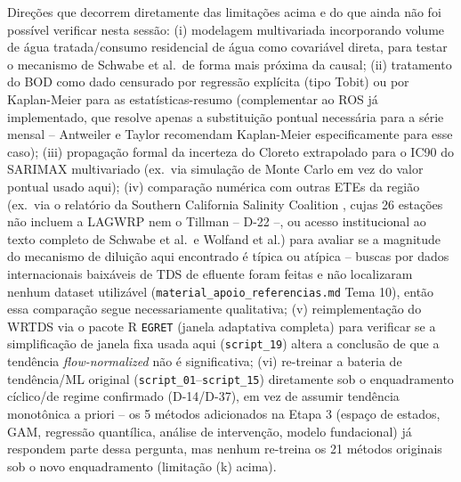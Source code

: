 Direções que decorrem diretamente das limitações acima e do que ainda não foi possível verificar nesta sessão: (i) modelagem multivariada incorporando volume de água tratada/consumo residencial de água como covariável direta, para testar o mecanismo de Schwabe et al.\ de forma mais próxima da causal; (ii) tratamento do BOD como dado censurado por regressão explícita (tipo Tobit) ou por Kaplan-Meier para as estatísticas-resumo (complementar ao ROS já implementado, que resolve apenas a substituição pontual necessária para a série mensal -- Antweiler e Taylor \cite{antweiler2008evaluation} recomendam Kaplan-Meier especificamente para esse caso); (iii) propagação formal da incerteza do Cloreto extrapolado para o IC90 do SARIMAX multivariado (ex.\ via simulação de Monte Carlo em vez do valor pontual usado aqui); (iv) comparação numérica com outras ETEs da região (ex.\ via o relatório da Southern California Salinity Coalition \cite{scsc2018tds}, cujas 26 estações não incluem a LAGWRP nem o Tillman -- D-22 --, ou acesso institucional ao texto completo de Schwabe et al.\ e Wolfand et al.) para avaliar se a magnitude do mecanismo de diluição aqui encontrado é típica ou atípica -- buscas por dados internacionais baixáveis de TDS de efluente foram feitas e não localizaram nenhum dataset utilizável (\texttt{material\_apoio\_referencias.md} Tema 10), então essa comparação segue necessariamente qualitativa; (v) reimplementação do WRTDS via o pacote R \texttt{EGRET} (janela adaptativa completa) para verificar se a simplificação de janela fixa usada aqui (\texttt{script\_19}) altera a conclusão de que a tendência \textit{flow-normalized} não é significativa; (vi) re-treinar a bateria de tendência/ML original (\texttt{script\_01}--\texttt{script\_15}) diretamente sob o enquadramento cíclico/de regime confirmado (D-14/D-37), em vez de assumir tendência monotônica a priori -- os 5 métodos adicionados na Etapa 3 (espaço de estados, GAM, regressão quantílica, análise de intervenção, modelo fundacional) já respondem parte dessa pergunta, mas nenhum re-treina os 21 métodos originais sob o novo enquadramento (limitação (k) acima).
